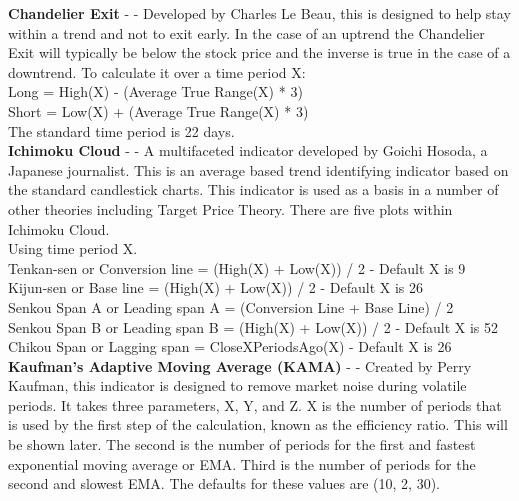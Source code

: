 \documentclass[conference]{IEEEtran}
\begin{document}
\noindent
\textbf{Chandelier Exit} - \cite{Elder2002} - Developed by Charles Le Beau, this is designed to help stay within a trend and not to exit early. In the case of an uptrend the Chandelier Exit will typically be below the stock price and the inverse is true in the case of a downtrend. To calculate it over a time period X:\\

\noindent
Long = High(X) - (Average True Range(X) * 3)\\
Short = Low(X) + (Average True Range(X) * 3)\\
\noindent
The standard time period is 22 days.\\

\iffalse
[]
\fi

\noindent
\textbf{Ichimoku Cloud} - \cite{Murphy1999} - A multifaceted indicator developed by Goichi Hosoda, a Japanese journalist. This is an average based trend identifying indicator based on the standard candlestick charts. This indicator is used as a basis in a number of other theories including Target Price Theory. There are five plots within Ichimoku Cloud.\\

\noindent
Using time period X.\\
Tenkan-sen or Conversion line = (High(X) + Low(X)) / 2  - Default X is 9 \\
Kijun-sen or Base line = (High(X) + Low(X)) / 2 - Default X is 26 \\
Senkou Span A or Leading span A = (Conversion Line + Base Line) / 2 \\
Senkou Span B or Leading span B = (High(X) + Low(X)) / 2 - Default X is 52 \\
Chikou Span or Lagging span = CloseXPeriodsAgo(X) - Default X is 26\\

\iffalse
[]
\fi

\noindent
\textbf{Kaufman's Adaptive Moving Average (KAMA)} - \cite{Kaufman1998} - Created by Perry Kaufman, this indicator is designed to remove market noise during volatile periods. It takes three parameters, X, Y, and Z. X is the number of periods that is used by the first step of the calculation, known as the efficiency ratio. This will be shown later. The second is the number of periods for the first and fastest exponential moving average or EMA. Third is the number of periods for the second and slowest EMA. The defaults for these values are (10, 2, 30). \\
\end{document}

